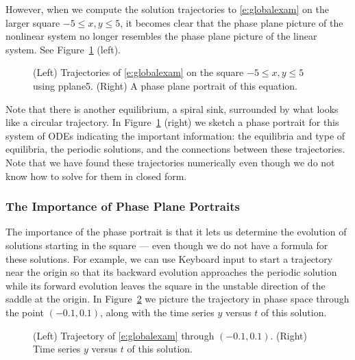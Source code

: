 \documentclass{ximera}
\begin{document}
However, when we compute the solution trajectories to
\eqref{e:globalexam} on the larger square $-5\leq x,y\leq 5$, it
becomes clear that the phase plane picture of 
the nonlinear
system no longer resembles the phase plane picture of the linear
system.  See Figure~\ref{F:globalb} (left).
\begin{figure}[htb]
           \centerline{%
           }
           \caption{(Left) Trajectories of \protect\eqref{e:globalexam} 
on the square $-5\leq x,y \leq 5$ using {\sf pplane5}. (Right) A
phase plane portrait of this equation.}
           \label{F:globalb}
\end{figure}
Note that there is another equilibrium, a spiral sink,
surrounded by what looks like a circular trajectory.  In 
Figure~\ref{F:globalb} (right) we sketch a phase portrait for 
this system of ODEs indicating the important information: 
the equilibria and type of equilibria, the periodic solutions,
and the connections between these trajectories.  Note that we have found
these trajectories numerically even though we do not know how to solve for
them in closed form.

\subsubsection*{The Importance of Phase Plane Portraits}

The importance of the phase portrait is that it lets us determine the 
evolution of solutions starting in the square --- even though we do not 
have a formula for these solutions.  For example, we can use 
{\sf Keyboard input} to start a trajectory near the origin so
that its backward evolution
approaches the periodic solution
while its forward evolution leaves the square in the unstable
direction of the saddle at 
the origin.  In Figure~\ref{F:nltraj}
we picture the trajectory in phase space through the point 
$(-0.1,0.1)$, along with the time series $y$ versus $t$ of this
solution.  

\begin{figure}[htb]
           \centerline{%
           }
           \caption{(Left) Trajectory of \protect\eqref{e:globalexam} 
	through $(-0.1,0.1)$. (Right) Time series $y$ versus $t$ of
this solution.}
           \label{F:nltraj}
\end{figure}
\end{document}
